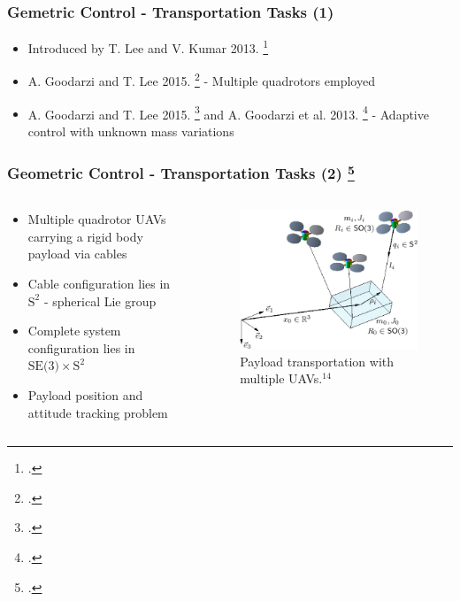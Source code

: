 \begin{frame}
	\frametitle{Gemetric Control - Transportation Tasks (1)}
	
	\begin{itemize}
		\item Introduced by T. Lee and V. Kumar 2013. \footcite{cable-load1}
		\item A. Goodarzi and T. Lee 2015. \footcite{cable-load-multiple} - Multiple quadrotors employed
		\item  A. Goodarzi and T. Lee 2015. \footcite{flexible-cable-dynamics} and A. Goodarzi et al. 2013. \footcite{stabilization-flexible-cable} - Adaptive control with unknown mass variations
	\end{itemize}
\end{frame}

\begin{frame}
	\frametitle{Geometric Control - Transportation Tasks (2) \footcite{Lee2014GeometricCO}}
	
	\begin{columns}
		\begin{column}{0.5\textwidth}\centering
			\begin{itemize}
				\item Multiple quadrotor UAVs carrying a rigid body payload via cables
				\item Cable configuration lies in $\text{S}^2$ - spherical Lie group
				\item Complete system configuration lies in $\text{SE(3)} \times \text{S}^2$
				\item Payload position and attitude tracking problem
			\end{itemize}
		\end{column}
		
		\begin{column}{0.5\textwidth}\centering
			\begin{figure}[H]
				\includegraphics[width=0.9\columnwidth]{figures/payload_carrying.png}
				\caption{Payload transportation with multiple UAVs.${}^{14}$}
				\centering
			\end{figure}
		\end{column}
	\end{columns}
		
\end{frame}